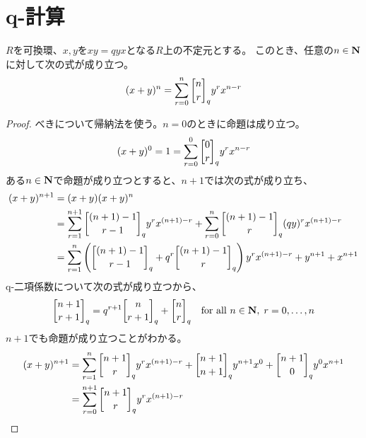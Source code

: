 {\setlength\arraycolsep{2pt}
%
\section{q-計算}\label{s1:q-計算} %
	\begin{proposition}[Schutzenbergerの公式]
	\label{prop:Schutzenbergerの公式} %
		$R$を可換環、$x,y$を$xy=qyx$となる$R$上の不定元とする。
		このとき、任意の$n\in\mathbf{N}$に対して次の式が成り立つ。
		\begin{equation*}\begin{split}
			(x + y)^n = \sum_{r=0}^n\qbinom{n}{r}_q y^rx^{n-r}
		\end{split}\end{equation*}
	\end{proposition} %
	\begin{proof} %
		べきについて帰納法を使う。$n=0$のときに命題は成り立つ。
		\begin{equation*}\begin{split}
			(x+y)^0 = 1 = \sum_{r=0}^0\qbinom{0}{r}_q y^rx^{n-r}
		\end{split}\end{equation*}
		ある$n\in\mathbf{N}$で命題が成り立つとすると、$n+1$では次の式が成り立ち、
		\begin{equation*}\begin{split}
			(x+y)^{n+1} &= (x+y)(x+y)^n \\
			&= \sum_{r=1}^{n+1} \qbinom{(n+1) - 1}{r - 1}_q y^rx^{(n+1) - r}
				+ \sum_{r=0}^{n} \qbinom{(n+1) - 1}{r}_q (qy)^rx^{(n+1) - r} \\
			&= \sum_{r=1}^n \lr{
				\qbinom{(n+1) - 1}{r - 1}_q + q^r\qbinom{(n+1) - 1}{r}_q} 
				y^rx^{(n+1) - r} + y^{n+1} + x^{n+1} \\
		\end{split}\end{equation*}
		q-二項係数について次の式が成り立つから、
		\begin{equation*}\begin{split}
			\qbinom{n+1}{r+1}_q = q^{r+1}\qbinom{n}{r+1}_q + \qbinom{n}{r}_q
			\quad\text{for all } n\in\sizen,\; r=0,\dots,n
		\end{split}\end{equation*}
		$n+1$でも命題が成り立つことがわかる。
		\begin{equation*}\begin{split}
			(x+y)^{n+1} &= \sum_{r=1}^n \qbinom{n+1}{r}_q y^rx^{(n+1)-r}
			+ \qbinom{n+1}{n+1}_q y^{n+1}x^0 + \qbinom{n+1}{0}_q y^0x^{n+1} \\
			&= \sum_{r=0}^{n+1} \qbinom{n+1}{r}_q y^rx^{(n+1)-r}
		\end{split}\end{equation*}
	\end{proof} %
%
}\endgroup %
